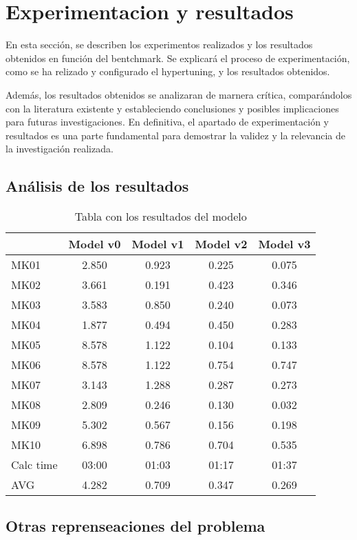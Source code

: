 \section{Experimentacion y resultados}
En esta sección, se describen los experimentos realizados y los resultados
obtenidos en función del bentchmark. Se explicará el proceso de experimentación,
como se ha relizado y configurado el hypertuning, y los resultados obtenidos.\medskip

Además, los resultados obtenidos se analizaran de marnera crítica, 
comparándolos con la literatura existente y estableciendo conclusiones y 
posibles implicaciones para futuras investigaciones. En definitiva, el 
apartado de experimentación y resultados es una parte fundamental para 
demostrar la validez y la relevancia de la investigación realizada.


\subsection{Análisis de los resultados}
\begin{table}[ht]
    \centering
    \begin{tabular}[ht]{|l|cccc|}
        \hline
                  & Model v0 & Model v1 & Model v2 & Model v3 \\
        \hline
        MK01      & 2.850    & 0.923    & 0.225    & 0.075    \\
        MK02      & 3.661    & 0.191    & 0.423    & 0.346    \\
        MK03      & 3.583    & 0.850    & 0.240    & 0.073    \\
        MK04      & 1.877    & 0.494    & 0.450    & 0.283    \\
        MK05      & 8.578    & 1.122    & 0.104    & 0.133    \\
        MK06      & 8.578    & 1.122    & 0.754    & 0.747    \\
        MK07      & 3.143    & 1.288    & 0.287    & 0.273    \\
        MK08      & 2.809    & 0.246    & 0.130    & 0.032    \\
        MK09      & 5.302    & 0.567    & 0.156    & 0.198    \\
        MK10      & 6.898    & 0.786    & 0.704    & 0.535    \\
        \hline
        Calc time & 03:00    & 01:03    & 01:17    & 01:37    \\
        AVG       & 4.282    & 0.709    & 0.347    & 0.269    \\
        \hline
    \end{tabular}
    \caption{Tabla con los resultados del modelo}
\end{table}
\subsection{Otras reprenseaciones del problema}

\pagebreak
